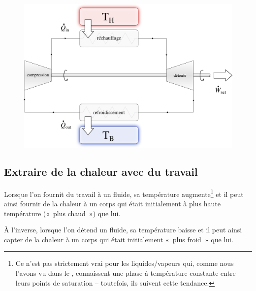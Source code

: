		\begin{figure}
			\begin{center}
				\includegraphics[width=\textwidth]{images/moteur_so_travail_net.png}
			\end{center}
			\label{fig_cycle_thermodynamique_du_moteur_axe_so}
		\end{figure}


	\subsection{Extraire de la chaleur avec du travail}
	\label{ch_principe_fonctionnement_réfrigérateur}

			Lorsque l’on fournit du travail à un fluide, sa température augmente\footnote{Ce n’est pas strictement vrai pour les liquides/vapeurs qui, comme nous l’avons vu dans le \courscinq, connaissent une phase à température constante entre leurs points de saturation – toutefois, ils suivent cette tendance.} et il peut ainsi fournir de la chaleur à un corps qui était initialement à plus haute température («~plus chaud~») que lui.

			À l’inverse, lorsque l’on détend un fluide, sa température baisse et il peut ainsi capter de la chaleur à un corps qui était initialement «~plus froid~» que lui.


